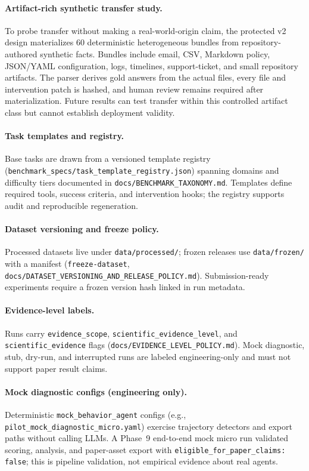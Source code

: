 \paragraph{Artifact-rich synthetic transfer study.}
To probe transfer without making a real-world-origin claim, the protected v2 design materializes 60 deterministic heterogeneous bundles from repository-authored synthetic facts. Bundles include email, CSV, Markdown policy, JSON/YAML configuration, logs, timelines, support-ticket, and small repository artifacts. The parser derives gold answers from the actual files, every file and intervention patch is hashed, and human review remains required after materialization. Future results can test transfer within this controlled artifact class but cannot establish deployment validity.

\paragraph{Task templates and registry.}
Base tasks are drawn from a versioned template registry (\texttt{benchmark\_specs/task\_template\_registry.json}) spanning domains and difficulty tiers documented in \texttt{docs/BENCHMARK\_TAXONOMY.md}. Templates define required tools, success criteria, and intervention hooks; the registry supports audit and reproducible regeneration.

\paragraph{Dataset versioning and freeze policy.}
Processed datasets live under \texttt{data/processed/}; frozen releases use \texttt{data/frozen/} with a manifest (\texttt{freeze-dataset}, \texttt{docs/DATASET\_VERSIONING\_AND\_RELEASE\_POLICY.md}). Submission-ready experiments require a frozen version hash linked in run metadata.

\paragraph{Evidence-level labels.}
Runs carry \texttt{evidence\_scope}, \texttt{scientific\_evidence\_level}, and \texttt{scientific\_evidence} flags (\texttt{docs/EVIDENCE\_LEVEL\_POLICY.md}). Mock diagnostic, stub, dry-run, and interrupted runs are labeled engineering-only and must not support paper result claims.

\paragraph{Mock diagnostic configs (engineering only).}
Deterministic \texttt{mock\_behavior\_agent} configs (e.g., \texttt{pilot\_mock\_diagnostic\_micro.yaml}) exercise trajectory detectors and export paths without calling LLMs. A Phase~9 end-to-end mock micro run validated scoring, analysis, and paper-asset export with \texttt{eligible\_for\_paper\_claims: false}; this is pipeline validation, not empirical evidence about real agents.

